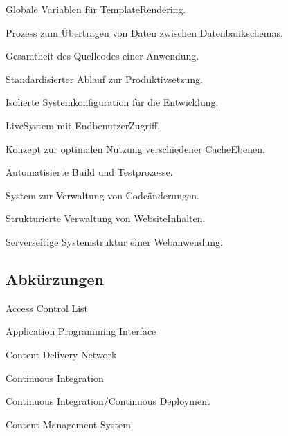 \documentclass[a4paper,12pt,ngerman]{sphinxmanual}
\begin{document}
\sphinxAtStartPar
{}
Globale Variablen für Template\sphinxhyphen{}Rendering.

\sphinxAtStartPar
{}
Prozess zum Übertragen von Daten zwischen Datenbankschemas.

\sphinxAtStartPar
{}
Gesamtheit des Quellcodes einer Anwendung.

\sphinxAtStartPar
{}
Standardisierter Ablauf zur Produktivsetzung.

\sphinxAtStartPar
{}
Isolierte Systemkonfiguration für die Entwicklung.

\sphinxAtStartPar
{}
Live\sphinxhyphen{}System mit Endbenutzer\sphinxhyphen{}Zugriff.

\sphinxAtStartPar
{}
Konzept zur optimalen Nutzung verschiedener Cache\sphinxhyphen{}Ebenen.

\sphinxAtStartPar
{}
Automatisierte Build\sphinxhyphen{} und Testprozesse.

\sphinxAtStartPar
{}
System zur Verwaltung von Codeänderungen.

\sphinxAtStartPar
{}
Strukturierte Verwaltung von Website\sphinxhyphen{}Inhalten.

\sphinxAtStartPar
{}
Serverseitige Systemstruktur einer Webanwendung.


\subsection{Abkürzungen}
\label{\detokenize{sections/glosar:abkurzungen}}
\sphinxAtStartPar
{}
Access Control List

\sphinxAtStartPar
{}
Application Programming Interface

\sphinxAtStartPar
{}
Content Delivery Network

\sphinxAtStartPar
{}
Continuous Integration

\sphinxAtStartPar
{}
Continuous Integration/Continuous Deployment

\sphinxAtStartPar
{}
Content Management System
\end{document}
